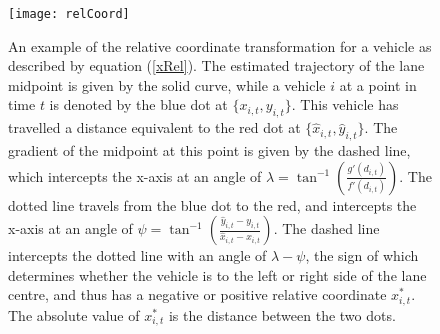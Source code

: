 \documentclass[12pt,a4paper]{article}\usepackage[]{graphicx}\usepackage[]{color}
\begin{document}
\begin{figure}
\centering
\texttt{[image: relCoord]}
\caption{An example of the relative coordinate transformation for a vehicle as described by equation (\ref{xRel}). The estimated trajectory of the lane midpoint is given by the solid curve, while a vehicle $i$ at a point in time $t$ is denoted by the blue dot at $\{x_{i, t}, y_{i, t}\}$. This vehicle has travelled a distance equivalent to the red dot at $\{\hat{x}_{i, t}, \hat{y}_{i, t}\}$. The gradient of the midpoint at this point is given by the dashed line, which intercepts the x-axis at an angle of $\lambda = \tan^{-1}\left(\frac{g'(d_{i, t}) }{f'(d_{i, t})}\right)$. The dotted line travels from the blue dot to the red, and intercepts the x-axis at an angle of $\psi = \tan^{-1}\left(\frac{\hat{y}_{i, t} - y_{i, t}}{\hat{x}_{i, t} - x_{i, t}} \right)$. The dashed line intercepts the dotted line with an angle  of $\lambda - \psi$, the sign of which determines whether the vehicle is to the left or right side of the lane centre, and thus has a negative or positive relative coordinate $x^*_{i, t}$. The absolute value of $x^*_{i, t}$ is the distance between the two dots.}
\label{fig:relCoord}
\end{figure}
\end{document}
